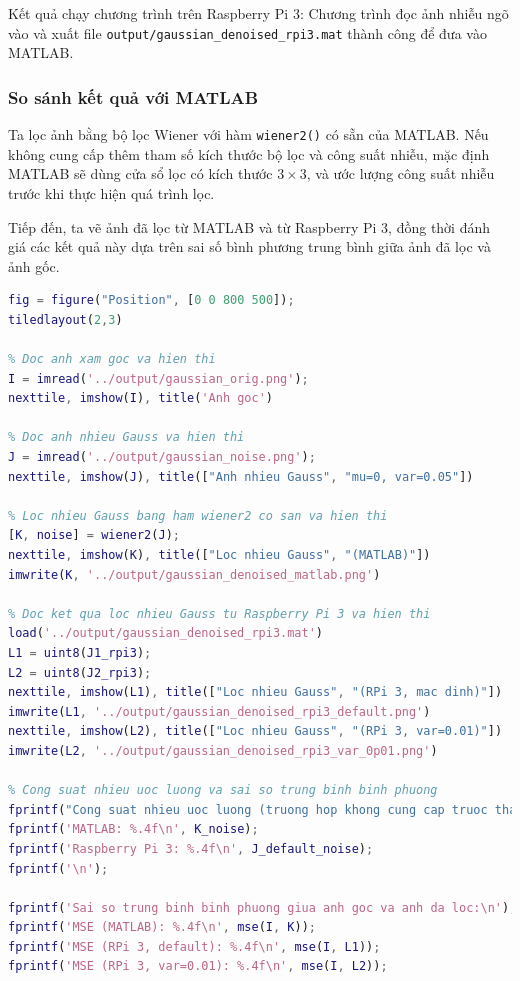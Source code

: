 Kết quả chạy chương trình trên Raspberry Pi 3: 
Chương trình đọc ảnh nhiễu ngõ vào và xuất file \verb|output/gaussian_denoised_rpi3.mat| thành công để đưa vào MATLAB.

\subsubsection{So sánh kết quả với MATLAB}

Ta lọc ảnh bằng bộ lọc Wiener với hàm \texttt{wiener2()} có sẵn của MATLAB. 
Nếu không cung cấp thêm tham số kích thước bộ lọc và công suất nhiễu,
mặc định MATLAB sẽ dùng cửa sổ lọc có kích thước $3 \times 3$, 
và ước lượng công suất nhiễu trước khi thực hiện quá trình lọc.

Tiếp đến, ta vẽ ảnh đã lọc từ MATLAB và từ Raspberry Pi 3, 
đồng thời đánh giá các kết quả này dựa trên sai số bình phương trung bình giữa ảnh đã lọc và ảnh gốc.

\begin{lstlisting}[language=MATLAB]
fig = figure("Position", [0 0 800 500]);
tiledlayout(2,3)

% Doc anh xam goc va hien thi
I = imread('../output/gaussian_orig.png');
nexttile, imshow(I), title('Anh goc')

% Doc anh nhieu Gauss va hien thi
J = imread('../output/gaussian_noise.png');
nexttile, imshow(J), title(["Anh nhieu Gauss", "mu=0, var=0.05"])

% Loc nhieu Gauss bang ham wiener2 co san va hien thi
[K, noise] = wiener2(J);
nexttile, imshow(K), title(["Loc nhieu Gauss", "(MATLAB)"])
imwrite(K, '../output/gaussian_denoised_matlab.png')

% Doc ket qua loc nhieu Gauss tu Raspberry Pi 3 va hien thi
load('../output/gaussian_denoised_rpi3.mat')
L1 = uint8(J1_rpi3);
L2 = uint8(J2_rpi3);
nexttile, imshow(L1), title(["Loc nhieu Gauss", "(RPi 3, mac dinh)"])
imwrite(L1, '../output/gaussian_denoised_rpi3_default.png')
nexttile, imshow(L2), title(["Loc nhieu Gauss", "(RPi 3, var=0.01)"])
imwrite(L2, '../output/gaussian_denoised_rpi3_var_0p01.png')

% Cong suat nhieu uoc luong va sai so trung binh binh phuong
fprintf("Cong suat nhieu uoc luong (truong hop khong cung cap truoc tham so nhieu):\n");
fprintf('MATLAB: %.4f\n', K_noise);
fprintf('Raspberry Pi 3: %.4f\n', J_default_noise);
fprintf('\n');

fprintf('Sai so trung binh binh phuong giua anh goc va anh da loc:\n');
fprintf('MSE (MATLAB): %.4f\n', mse(I, K));
fprintf('MSE (RPi 3, default): %.4f\n', mse(I, L1));
fprintf('MSE (RPi 3, var=0.01): %.4f\n', mse(I, L2));
\end{lstlisting}

